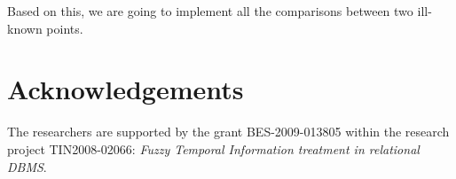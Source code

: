 \documentclass{llncs}
\begin{document}








Based on this, we are going to implement all the comparisons between two ill-known points.
% 
% 
% 
% 
% 




\newpage

\section*{Acknowledgements}
%
The researchers are supported by the grant BES-2009-013805 within the research project TIN2008-02066: \emph{Fuzzy Temporal Information treatment in relational DBMS}.



\end{document}
